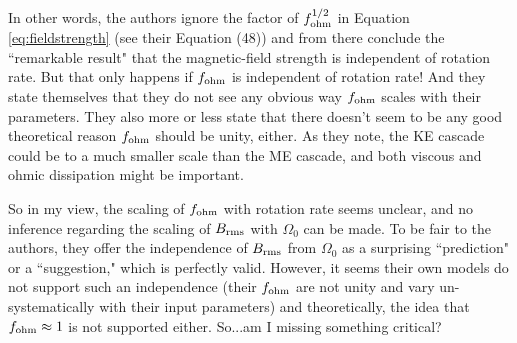 \documentclass[12pt]{article} %
\begin{document}
In other words, the authors ignore the factor of $f_{\rm{ohm}}^{1/2}$ in Equation \eqref{eq:fieldstrength} (see their Equation (48)) and from there conclude the ``remarkable result" that the magnetic-field strength is independent of rotation rate. But that only happens if $f_{\rm{ohm}}$ is independent of rotation rate! And they state themselves that they do not see any obvious way $f_{\rm{ohm}}$ scales with their parameters. They also more or less state that there doesn't seem to be any good theoretical reason $f_{\rm{ohm}}$ should be unity, either. As they note, the KE cascade could be to a much smaller scale than the ME cascade, and both viscous and ohmic dissipation might be important. 

So in my view, the scaling of $f_{\rm{ohm}}$ with rotation rate seems unclear, and no inference regarding the scaling of $B_{\rm{rms}}$ with $\Omega_0$  can be made. To be fair to the authors, they offer the independence of $B_{\rm{rms}}$ from $\Omega_0$ as a surprising ``prediction" or a ``suggestion," which is perfectly valid. However, it seems their own models do not support such an independence (their $f_{\rm{ohm}}$ are not unity and vary un-systematically with their input parameters) and theoretically, the idea that $f_{\rm{ohm}}\approx1$ is not supported either. So...am I missing something critical? 


\end{document}
